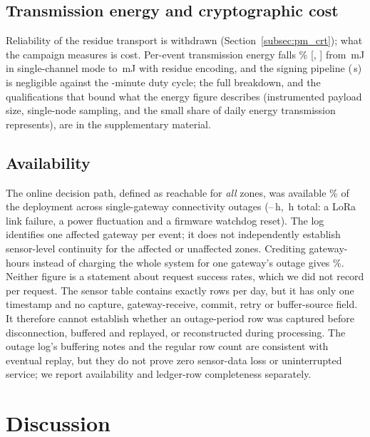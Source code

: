 \documentclass[a4paper,fleqn]{cas-sc}
\begin{document}
\subsection{Transmission energy and cryptographic cost}
\label{subsec:integrity}

Reliability of the residue transport is withdrawn (Section~\ref{subsec:pm_crt});
what the campaign measures is cost. Per-event transmission energy falls
\EnergyReductionPct\% [\EnergyReductionCILow, \EnergyReductionCIHigh] from
\EnergySingle\,mJ in single-channel mode to \EnergyCRT\,mJ with residue
encoding, and the signing pipeline (\SignTotal\,\textmu{}s) is negligible
against the \DutyCycleMinutes-minute duty cycle; the full breakdown, and
the qualifications that bound what the energy figure describes (instrumented
payload size, single-node sampling, and the small share of daily energy
transmission represents), are in the supplementary material.

\subsection{Availability}
\label{subsec:availability}

The online decision path, defined as reachable for \emph{all} zones, was
available \UptimePct\% of the deployment across \OutageCount{}
single-gateway connectivity outages (\OutageHoursMin--\OutageHoursMax\,h,
\OutageHoursTotal\,h total: a LoRa link failure, a power fluctuation and a
firmware watchdog reset). The log identifies one affected gateway per event;
it does not independently establish sensor-level continuity for the affected
or unaffected zones. Crediting gateway-hours instead of charging the whole
system for one gateway's outage gives \UptimeGatewayHoursPct\%. Neither
figure is a statement about request success rates, which we did not
record per request. The sensor table contains exactly \WritesPerDay{} rows
per day, but it has only one timestamp and no capture, gateway-receive,
commit, retry or buffer-source field. It therefore cannot establish whether
an outage-period row was captured before disconnection, buffered and replayed,
or reconstructed during processing. The outage log's buffering notes and the
regular row count are consistent with eventual replay, but they do not prove
zero sensor-data loss or uninterrupted service; we report availability and
ledger-row completeness separately.

\FloatBarrier
\section{Discussion}
\label{sec:discussion}
\label{sec:audit}
\end{document}
